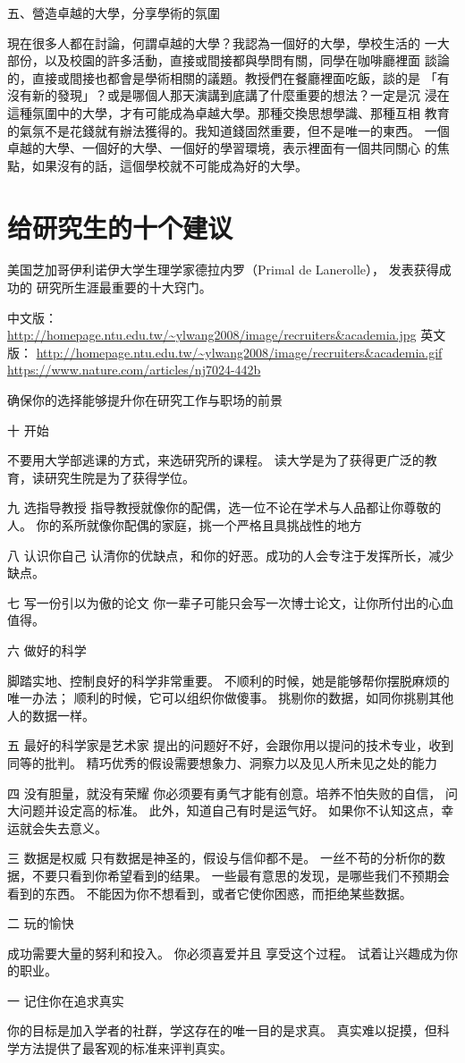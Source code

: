 五、營造卓越的大學，分享學術的氛圍

現在很多人都在討論，何謂卓越的大學？我認為一個好的大學，學校生活的
一大部份，以及校園的許多活動，直接或間接都與學問有關，同學在咖啡廳裡面
談論的，直接或間接也都會是學術相關的議題。教授們在餐廳裡面吃飯，談的是
「有沒有新的發現」？或是哪個人那天演講到底講了什麼重要的想法？一定是沉
浸在這種氛圍中的大學，才有可能成為卓越大學。那種交換思想學識、那種互相
教育的氣氛不是花錢就有辦法獲得的。我知道錢固然重要，但不是唯一的東西。
一個卓越的大學、一個好的大學、一個好的學習環境，表示裡面有一個共同關心
的焦點，如果沒有的話，這個學校就不可能成為好的大學。

\section{给研究生的十个建议}

美国芝加哥伊利诺伊大学生理学家德拉内罗（Primal de Lanerolle）， 发表获得成功的
研究所生涯最重要的十大窍门。

中文版： \url{http://homepage.ntu.edu.tw/~ylwang2008/image/recruiters&academia.jpg}
英文版： \url{http://homepage.ntu.edu.tw/~ylwang2008/image/recruiters&academia.gif}
   \url{https://www.nature.com/articles/nj7024-442b}

确保你的选择能够提升你在研究工作与职场的前景

十  开始

不要用大学部逃课的方式，来选研究所的课程。
读大学是为了获得更广泛的教育，读研究生院是为了获得学位。

九 选指导教授
 指导教授就像你的配偶，选一位不论在学术与人品都让你尊敬的人。
 你的系所就像你配偶的家庭，挑一个严格且具挑战性的地方
 
八 认识你自己
认清你的优缺点，和你的好恶。成功的人会专注于发挥所长，减少缺点。

七 写一份引以为傲的论文
你一辈子可能只会写一次博士论文，让你所付出的心血值得。

六 做好的科学

脚踏实地、控制良好的科学非常重要。
不顺利的时候，她是能够帮你摆脱麻烦的唯一办法；
顺利的时候，它可以组织你做傻事。
挑剔你的数据，如同你挑剔其他人的数据一样。

五  最好的科学家是艺术家
提出的问题好不好，会跟你用以提问的技术专业，收到同等的批判。
精巧优秀的假设需要想象力、洞察力以及见人所未见之处的能力

四  没有胆量，就没有荣耀
你必须要有勇气才能有创意。培养不怕失败的自信，
问大问题并设定高的标准。
此外，知道自己有时是运气好。 如果你不认知这点，幸运就会失去意义。

三 数据是权威
只有数据是神圣的，假设与信仰都不是。
一丝不苟的分析你的数据，不要只看到你希望看到的结果。
一些最有意思的发现，是哪些我们不预期会看到的东西。
不能因为你不想看到，或者它使你困惑，而拒绝某些数据。

二 玩的愉快

成功需要大量的努利和投入。 你必须喜爱并且 享受这个过程。
试着让兴趣成为你的职业。

一 记住你在追求真实

你的目标是加入学者的社群，学这存在的唯一目的是求真。
真实难以捉摸，但科学方法提供了最客观的标准来评判真实。






